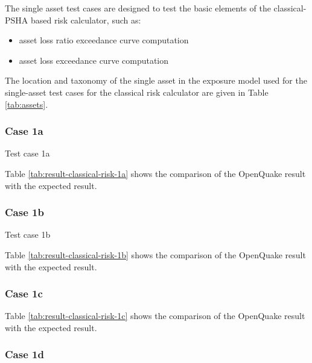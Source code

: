 The single asset test cases are designed to test the basic elements of the classical-PSHA based risk calculator, such as:

\begin{itemize}
\item asset loss ratio exceedance curve computation
\item asset loss exceedance curve computation
\end{itemize}

The location and taxonomy of the single asset in the exposure model used for the single-asset test cases for the classical risk calculator are given in Table \ref{tab:assets}.

\subsubsection{Case 1a}
Test case 1a 



Table \ref{tab:result-classical-risk-1a} shows the comparison of the OpenQuake result with the expected result.

\subsubsection{Case 1b}
Test case 1b 



Table \ref{tab:result-classical-risk-1b} shows the comparison of the OpenQuake result with the expected result.

\subsubsection{Case 1c}




Table \ref{tab:result-classical-risk-1c} shows the comparison of the OpenQuake result with the expected result.

\subsubsection{Case 1d}


